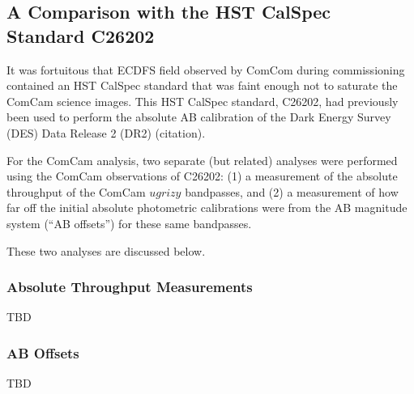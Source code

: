 \subsection{A Comparison with the HST CalSpec Standard C26202}

It was fortuitous that ECDFS field observed by ComCom during commissioning 
contained an HST CalSpec standard that was faint enough not to saturate the
ComCam science images.  This HST CalSpec standard, C26202, had previously
been used to perform the absolute AB calibration of the Dark Energy Survey 
(DES) Data Release 2 (DR2) (citation). 

For the ComCam analysis, two separate (but related) analyses were performed
using the ComCam observations of C26202:  (1) a measurement of the absolute 
throughput of the ComCam $ugrizy$ bandpasses, and (2) a measurement of how 
far off the initial absolute photometric calibrations were from the AB 
magnitude system (``AB offsets'') for these same bandpasses.

These two analyses are discussed below.

\subsubsection{Absolute Throughput Measurements}

TBD

\subsubsection{AB Offsets}

TBD




